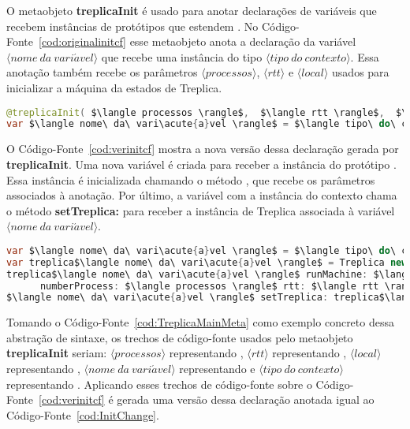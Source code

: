 O metaobjeto \textbf{treplicaInit} é usado para anotar declarações de variáveis que recebem instâncias de protótipos que estendem . No Código-Fonte~\ref{cod:originalinitcf} esse metaobjeto anota a declaração da variável $\langle nome\ da\ vari\acute{a}vel \rangle$ que recebe uma instância do tipo $\langle tipo\ do\ contexto \rangle$. Essa anotação também recebe os parâmetros $\langle processos \rangle$,  $\langle rtt \rangle$ e $\langle local \rangle$ usados para inicializar a máquina da estados de Treplica.

\begin{lstlisting}[language=Java, caption={Versão original do código-fonte que usa \textbf{treplicaInit}}, label={cod:originalinitcf}, mathescape=true]
@treplicaInit( $\langle processos \rangle$,  $\langle rtt \rangle$,  $\langle local \rangle$ )
var $\langle nome\ da\ vari\acute{a}vel \rangle$ = $\langle tipo\ do\ contexto \rangle$ new;
\end{lstlisting}

O Código-Fonte~\ref{cod:verinitcf} mostra a nova versão dessa declaração gerada por \textbf{treplicaInit}. Uma nova variável é criada para receber a instância do protótipo . Essa instância é inicializada chamando o método , que recebe os parâmetros associados à anotação. Por último, a variável com a instância do contexto chama o método \textbf{setTreplica:} para receber a instância de Treplica associada à variável $\langle nome\ da\ vari\acute{a}vel \rangle$.

\begin{lstlisting}[language=Java, caption={Nova versão do código-fonte de inicialização de Treplica}, label={cod:verinitcf}, mathescape=true]
var $\langle nome\ da\ vari\acute{a}vel \rangle$ = $\langle tipo\ do\ contexto \rangle$ new;
var treplica$\langle nome\ da\ vari\acute{a}vel \rangle$ = Treplica new;
treplica$\langle nome\ da\ vari\acute{a}vel \rangle$ runMachine: $\langle nome\ da\ vari\acute{a}vel \rangle$ 
      numberProcess: $\langle processos \rangle$ rtt: $\langle rtt \rangle$ path: $\langle local \rangle$;
$\langle nome\ da\ vari\acute{a}vel \rangle$ setTreplica: treplica$\langle nome\ da\ vari\acute{a}vel \rangle$;
\end{lstlisting}

Tomando o Código-Fonte~\ref{cod:TreplicaMainMeta} como exemplo concreto dessa abstração de sintaxe, os trechos de código-fonte usados pelo metaobjeto \textbf{treplicaInit} seriam: $\langle processos \rangle$ representando , $\langle rtt \rangle$ representando , $\langle local \rangle$ representando , $\langle nome\ da\ vari\acute{a}vel \rangle$ representando  e $\langle tipo\ do\ contexto \rangle$ representando . Aplicando esses trechos de código-fonte sobre o Código-Fonte~\ref{cod:verinitcf} é gerada uma versão dessa declaração anotada igual ao Código-Fonte~\ref{cod:InitChange}.